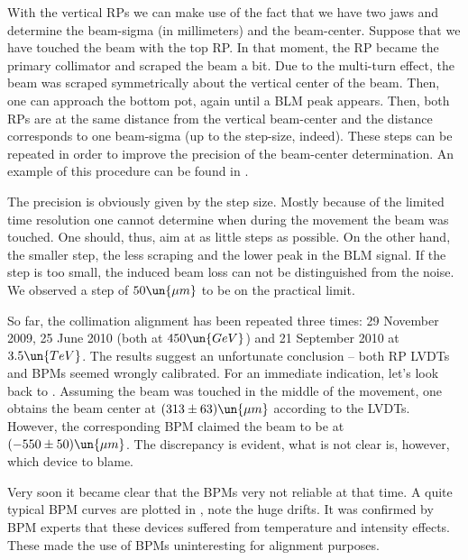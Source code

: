 With the vertical RPs we can make use of the fact that we have two jaws and determine the beam-sigma (in millimeters) and the beam-center. Suppose that we have touched the beam with the top RP. In that moment, the RP became the primary collimator and scraped the beam a bit. Due to the multi-turn effect, the beam was scraped symmetrically about the vertical center of the beam. Then, one can approach the bottom pot, again until a BLM peak appears. Then, both RPs are at the same distance from the vertical beam-center and the distance corresponds to one beam-sigma (up to the step-size, indeed). These steps can be repeated in order to improve the precision of the beam-center determination. An example of this procedure can be found in .


The precision is obviously given by the step size. Mostly because of the limited time resolution one cannot determine when during the movement the beam was touched. One should, thus, aim at as little steps as possible. On the other hand, the smaller step, the less scraping and the lower peak in the BLM signal. If the step is too small, the induced beam loss can not be distinguished from the noise. We observed a step of $50\un{\mu m}$ to be on the practical limit.

So far, the collimation alignment has been repeated three times: 29 November 2009, 25 June 2010 (both at $450\un{GeV}$) and 21 September 2010 at $3.5\un{TeV}$. The results suggest an unfortunate conclusion -- both RP LVDTs and BPMs seemed wrongly calibrated. For an immediate indication, let's look back to . Assuming the beam was touched in the middle of the movement, one obtains the beam center at $(313\pm 63)\un{\mu m}$ according to the LVDTs. However, the corresponding BPM claimed the beam to be at $(-550\pm50)\un{\mu m}$. The discrepancy is evident, what is not clear is, however, which device to blame.

Very soon it became clear that the BPMs very not reliable at that time. A quite typical BPM curves are plotted in , note the huge drifts. It was confirmed by BPM experts that these devices suffered from temperature and intensity effects. These made the use of BPMs uninteresting for alignment purposes.

